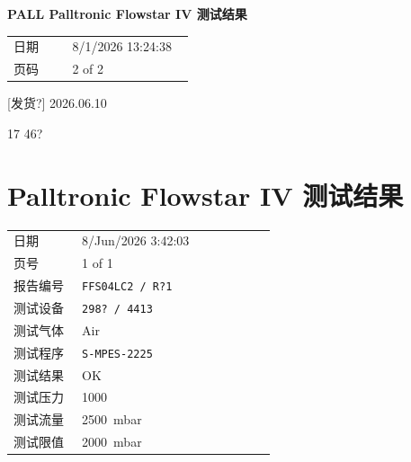\documentclass[UTF8,10pt,a4paper,fontset=fandol]{ctexart}
\newcommand{\fieldvalue}[1]{#1}
\newcommand{\handwritten}[1]{#1}
\begin{document}
\hfill
\begin{minipage}[t]{0.47\linewidth}
\centering
\textbf{PALL Palltronic Flowstar IV 测试结果}

\medskip
\begin{tabular}{@{}p{0.30\linewidth}p{0.62\linewidth}@{}}
日期 &
\fieldvalue{8/1/2026 13:24:38}
\\[2pt]
页码 &
2 of 2
\end{tabular}

\medskip

\medskip
\fieldvalue{\handwritten{[发货?] 2026.06.10}}

\medskip
\fieldvalue{\handwritten{17 46?}}
\end{minipage}

\newpage

\section{Palltronic Flowstar IV 测试结果}

\begin{tabular}{@{}p{0.24\linewidth}p{0.68\linewidth}@{}}
日期 &
\fieldvalue{8/Jun/2026 3:42:03}
\\
页号 &
\fieldvalue{1 of 1}
\\
报告编号 &
\fieldvalue{\texttt{FFS04LC2 / R?1}}
\\
测试设备 &
\fieldvalue{\texttt{298? / 4413}}
\\
测试气体 &
\fieldvalue{Air}
\\
测试程序 &
\fieldvalue{\texttt{S-MPES-2225}}
\\
测试结果 &
\fieldvalue{OK}
\\
测试压力 &
\fieldvalue{1000}
\\
测试流量 &
\fieldvalue{2500\ mbar}
\\
测试限值 &
\fieldvalue{2000\ mbar}
\\
\end{tabular}
\end{document}
